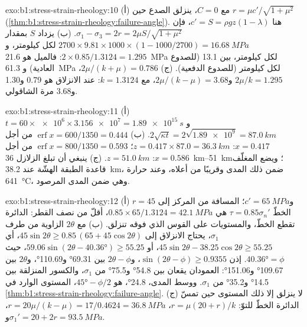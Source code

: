 \begin{solution}{exo:b1:stress-strain-rheology:10}
(أ) مع $C = 0$، ينزلق الصدع حين $r = \mu c'/\sqrt{1+\mu^2}$
(\cref{thm:b1:stress-strain-rheology:failure-angle}). هنا $c' = S =
\rho g z(1-\lambda)$، فإن $\sigma_1 - \sigma_3 = 2r = 2\mu S/\sqrt{1+\mu^2}$.
(ب) يزداد $S$ بمقدار $2700\times9.81\times1000\times(1 - 1000/2700) =
\qty{16.68}{MPa}$ لكل كيلومتر، و$2\times0.85/1.3124 = 1.295$: فالميل هو
\qty{21.6}{MPa} لكل كيلومتر، بين \num{13.1} (للصدوع العادية) و
\qty{61.3}{MPa} لكل كيلومتر (للصدوع الدفعية). (ج) $2\mu/(k+\mu) = 0.786$،
$2\mu/k = 1.295$ و$2\mu/(k-\mu) = 3.68$، مع $k = 1.3124$:  عند الانزلاق هو 0.79 و\num{1.30} و\num{3.68} مرة  الشاقولي.
\end{solution}

\begin{solution}{exo:b1:stress-strain-rheology:11}
(أ) $t = 60\times\num{e6}\times\num{3.156e7} = \qty{1.89e15}{s}$ و
$2\sqrt{\kappa t} = 2\sqrt{\num{1.89e9}} = \qty{87.0}{km}$. (ب)
$\operatorname{erf}x = 600/1350 = 0.444$ من أجل $x = 0.417$: $z = 0.417\times87.0
= \qty{36.3}{km}$؛ $\operatorname{erf}x = 800/1350 = 0.593$ من أجل $x = 0.586$:
$z = \qty{51.0}{km}$. (ج) ينبغي أن تبلغ الزلازل \qtyrange{36}{51}{km}؛
ويضع المغلّف قاعدة الطبقة الهشّة عند \qty{38.2}{km}، ضمن ذلك
المدى وقريبًا من أعلاه، وعند حرارة \qty{641}{\degreeCelsius}، وهي ضمن
المدى المرصود.
\end{solution}

\begin{solution}{exo:b1:stress-strain-rheology:12}
(أ) $r = 45$ و$c' = \qty{65}{MPa}$؛ المسافة من المركز إلى الخطّ
$\tau = 0.85\sigma_n'$ هي $0.85\times65/1.3124 = \qty{42.1}{MPa}$، أقلّ من
نصف القطر: الدائرة تقطع الخطّ، والمستويات على القوس الذي فوقه
تنزلق. (ب) مع $2\theta$ الزاوية من طرف $\sigma_1$، يحتاج الانزلاق إلى
$45\sin2\theta \ge 0.85\,(65 + 45\cos2\theta)$، أي
$45\sin2\theta - 38.25\cos2\theta \ge 55.25$، أو
$59.06\sin(2\theta - \ang{40.36}) \ge 55.25$، حيث $\ang{40.36} = \phi$.
إذن $\sin(2\theta - \phi) \ge 0.9355$، و$2\theta - \phi$ بين \ang{69.31}
و\ang{110.69}، و$2\theta$ بين \ang{109.67} و\ang{151.06}: العمودان
يقعان بين \ang{54.8} و\ang{75.5} من $\sigma_1$، والكسور المنزلقة
بين \ang{14.5} و\ang{35.2} من $\sigma_1$. ووسط المدى،
\ang{24.8}، هو $\ang{45} - \phi/2$، المستوى الوارد في
\cref{thm:b1:stress-strain-rheology:failure-angle}. (ج) لا ينزلق إلا ذلك المستوى
حين تمسّ الدائرة الخطّ للتوّ: $r = \mu(20 + r)/k$، $r = 20\mu/(k -
\mu) = 17/0.4624 = \qty{36.8}{MPa}$، و$\sigma_1' = 20 + 2r =
\qty{93.5}{MPa}$.
\end{solution}

